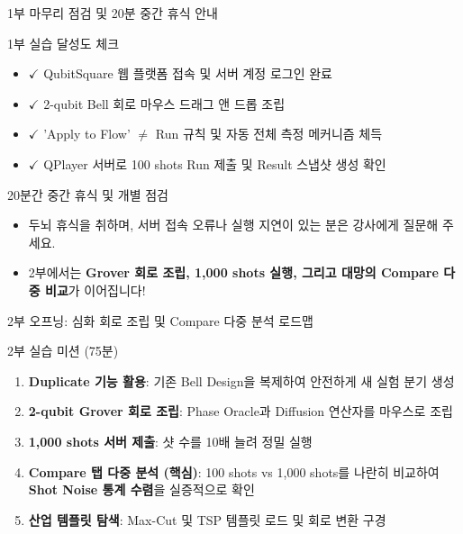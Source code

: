 \documentclass[aspectratio=169, 10pt]{beamer}
\begin{document}
\begin{frame}{1부 마무리 점검 및 20분 중간 휴식 안내}
    \begin{qcblock}{1부 실습 달성도 체크}
        \begin{itemize}
            \item $\checkmark$ QubitSquare 웹 플랫폼 접속 및 서버 계정 로그인 완료
            \pause
            \item $\checkmark$ 2-qubit Bell 회로 마우스 드래그 앤 드롭 조립
            \pause
            \item $\checkmark$ 'Apply to Flow' $\neq$ Run 규칙 및 자동 전체 측정 메커니즘 체득
            \pause
            \item $\checkmark$ QPlayer 서버로 100 shots Run 제출 및 Result 스냅샷 생성 확인
        \end{itemize}
    \end{qcblock}
    \vspace{0.3cm}
    \begin{qctip}{20분간 중간 휴식 및 개별 점검}
        \begin{itemize}
            \item 두뇌 휴식을 취하며, 서버 접속 오류나 실행 지연이 있는 분은 강사에게 질문해 주세요.
            \pause
            \item 2부에서는 \textbf{Grover 회로 조립, 1,000 shots 실행, 그리고 대망의 Compare 다중 비교}가 이어집니다!
        \end{itemize}
    \end{qctip}
\end{frame}

\begin{frame}{2부 오프닝: 심화 회로 조립 및 Compare 다중 분석 로드맵}
    \begin{qcblock}{2부 실습 미션 (75분)}
        \begin{enumerate}
            \item \textbf{Duplicate 기능 활용}: 기존 Bell Design을 복제하여 안전하게 새 실험 분기 생성
            \pause
            \item \textbf{2-qubit Grover 회로 조립}: Phase Oracle과 Diffusion 연산자를 마우스로 조립
            \pause
            \item \textbf{1,000 shots 서버 제출}: 샷 수를 10배 늘려 정밀 실행
            \pause
            \item \textbf{Compare 탭 다중 분석 (핵심)}: 100 shots vs 1,000 shots를 나란히 비교하여 \textbf{Shot Noise 통계 수렴}을 실증적으로 확인
            \pause
            \item \textbf{산업 템플릿 탐색}: Max-Cut 및 TSP 템플릿 로드 및 회로 변환 구경
        \end{enumerate}
    \end{qcblock}
\end{frame}
\end{document}
